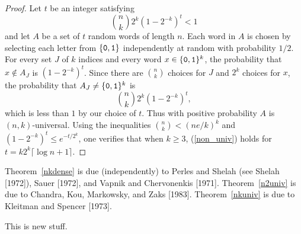 \documentclass[12pt]{article}
\begin{document}
\begin{proof}
Let $t$ be an integer satisfying
\begin{equation}\label{non_univ}
{n \choose k}2^k(1-2^{-k})^t < 1
\end{equation}
and let $A$ be a set of $t$ random words of length $n$.  Each word in $A$
is chosen by selecting each letter from $\{{\tt 0,1}\}$ independently
at random with probability $1/2$.  For every set $J$ of $k$ indices
and every word $x \in \{{\tt 0,1}\}^k$, the probability that $x \notin
A_J$ is $(1-2^{-k})^t$.  Since there are ${n \choose k}$ choices for
$J$ and $2^k$ choices for $x$, the probability that $A_J \neq \{{\tt
0,1}\}^k$ is
\[
{n \choose k}2^k(1-2^{-k})^t,
\]
which is less than $1$ by our choice of $t$.  Thus with positive
probability $A$ is $(n,k)$-universal.
Using the inequalities ${n \choose k} < (ne/k)^k$ and $(1-2^{-k})^t
\leq e^{-t/2^k}$, one verifies that when $k \geq 3$, (\ref{non_univ})
holds for $t = k2^k\lceil\log n + 1\rceil$.
\end{proof}

Theorem~\ref{nkdense} is due (independently) to Perles and Shelah (see
Shelah [1972]), Sauer [1972], and Vapnik and Chervonenkis [1971].
Theorem~\ref{n2univ} is due to Chandra, Kou, Markowsky, and Zaks
[1983].  Theorem~\ref{nkuniv} is due to Kleitman and Spencer [1973].

This is new stuff.
\end{document}
